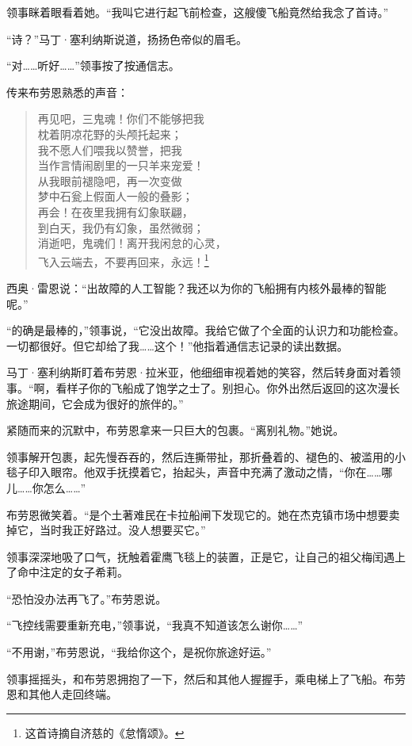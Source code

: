 \documentclass[AutoFakeBold=true]{book}
\begin{document}
领事眯着眼看着她。``我叫它进行起飞前检查，这艘傻飞船竟然给我念了首诗。''

``诗？''马丁·塞利纳斯说道，扬扬色帝似的眉毛。

``对……听好……''领事按了按通信志。

传来布劳恩熟悉的声音：

\begin{quote}
	{\kaishu 再见吧，三鬼魂！你们不能够把我\\
	枕着阴凉花野的头颅托起来；\\
	我不愿人们喂我以赞誉，把我\\
	当作言情闹剧里的一只羊来宠爱！\\
	从我眼前褪隐吧，再一次变做\\
	梦中石瓮上假面人一般的叠影；\\
	再会！在夜里我拥有幻象联翩，\\
	到白天，我仍有幻象，虽然微弱；\\
	消逝吧，鬼魂们！离开我闲怠的心灵，\\
	飞入云端去，不要再回来，永远！}\footnote{这首诗摘自济慈的《怠惰颂》。}
\end{quote}

西奥·雷恩说：``出故障的人工智能？我还以为你的飞船拥有内核外最棒的智能呢。''

``的确是最棒的，''领事说，``它没出故障。我给它做了个全面的认识力和功能检查。一切都很好。但它却给了我……这个！''他指着通信志记录的读出数据。

马丁·塞利纳斯盯着布劳恩·拉米亚，他细细审视着她的笑容，然后转身面对着领事。``啊，看样子你的飞船成了饱学之士了。别担心。你外出然后返回的这次漫长旅途期间，它会成为很好的旅伴的。''

紧随而来的沉默中，布劳恩拿来一只巨大的包裹。``离别礼物。''她说。

领事解开包裹，起先慢吞吞的，然后连撕带扯，那折叠着的、褪色的、被滥用的小毯子印入眼帘。他双手抚摸着它，抬起头，声音中充满了激动之情，``你在……哪儿……你怎么……''

布劳恩微笑着。``是个土著难民在卡拉船闸下发现它的。她在杰克镇市场中想要卖掉它，当时我正好路过。没人想要买它。''

领事深深地吸了口气，抚触着霍鹰飞毯上的装置，正是它，让自己的祖父梅闰遇上了命中注定的女子希莉。

``恐怕没办法再飞了。''布劳恩说。

``飞控线需要重新充电，''领事说，``我真不知道该怎么谢你……''

``不用谢，''布劳恩说，``我给你这个，是祝你旅途好运。''

领事摇摇头，和布劳恩拥抱了一下，然后和其他人握握手，乘电梯上了飞船。布劳恩和其他人走回终端。
\end{document}
